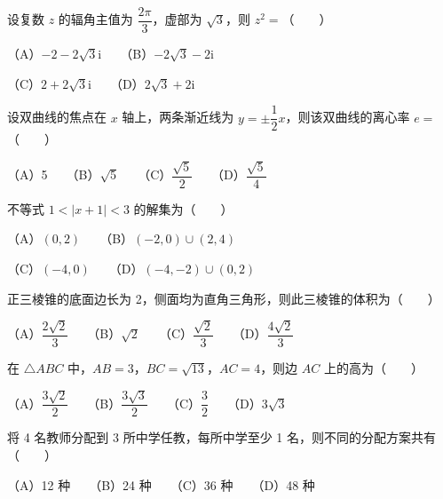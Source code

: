 \begin{question}
设复数 $z$ 的辐角主值为 $\dfrac{2\pi}{3}$，虚部为 $\sqrt{3}$，则 $z^2=$\mbox{（　　）}

（A）$-2-2\sqrt{3}\mathrm{i}$　　（B）$-2\sqrt{3}-2\mathrm{i}$

（C）$2+2\sqrt{3}\mathrm{i}$　　（D）$2\sqrt{3}+2\mathrm{i}$

\end{question}
\begin{question}
设双曲线的焦点在 $x$ 轴上，两条渐近线为 $y=\pm\dfrac{1}{2}x$，则该双曲线的离心率 $e=$\mbox{（　　）}

（A）5　　（B）$\sqrt{5}$　　（C）$\dfrac{\sqrt{5}}{2}$　　（D）$\dfrac{\sqrt{5}}{4}$

\end{question}
\begin{question}
不等式 $1<|x+1|<3$ 的解集为\mbox{（　　）}

（A）$(0,2)$　　（B）$(-2,0)\cup(2,4)$

（C）$(-4,0)$　　（D）$(-4,-2)\cup(0,2)$

\end{question}
\begin{question}
正三棱锥的底面边长为 2，侧面均为直角三角形，则此三棱锥的体积为\mbox{（　　）}

（A）$\dfrac{2\sqrt{2}}{3}$　　（B）$\sqrt{2}$　　（C）$\dfrac{\sqrt{2}}{3}$　　（D）$\dfrac{4\sqrt{2}}{3}$

\end{question}
\begin{question}
在 $\triangle ABC$ 中，$AB=3$，$BC=\sqrt{13}$，$AC=4$，则边 $AC$ 上的高为\mbox{（　　）}

（A）$\dfrac{3\sqrt{2}}{2}$　　（B）$\dfrac{3\sqrt{3}}{2}$　　（C）$\dfrac{3}{2}$　　（D）$3\sqrt{3}$

\end{question}
\begin{question}
将 4 名教师分配到 3 所中学任教，每所中学至少 1 名，则不同的分配方案共有\mbox{（　　）}

（A）12 种　　（B）24 种　　（C）36 种　　（D）48 种

\end{question}

